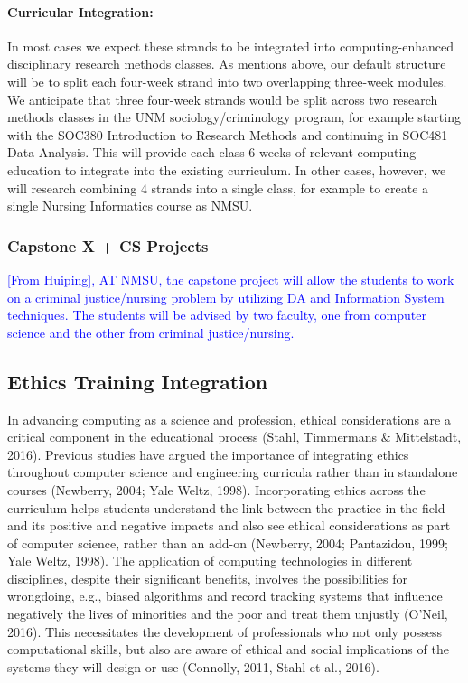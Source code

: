 \paragraph{Curricular Integration:} In most cases we expect these strands to be integrated into computing-enhanced disciplinary research methods classes. As mentions above, our default structure will be to split each four-week strand into two overlapping three-week modules. We anticipate that three four-week strands would be split across two research methods classes in the UNM sociology/criminology program, for example starting with the SOC380 Introduction to Research Methods and continuing in SOC481 Data Analysis. This will provide each class 6 weeks of relevant computing education to integrate into the existing curriculum. In other cases, however, we will research combining 4 strands into a single class, for example to create a single Nursing Informatics course as NMSU. 

\subsubsection{Capstone X + CS Projects}

\textcolor{blue}{[From Huiping], AT NMSU, the capstone project will allow the students to work on a criminal justice/nursing problem by utilizing DA and Information System techniques. The students will be advised by two faculty, one from computer science and the other from criminal justice/nursing.
}

\subsection{Ethics Training Integration}
In advancing computing as a science and profession, ethical considerations are a critical component in the educational process (Stahl, Timmermans \& Mittelstadt, 2016). Previous studies have argued the importance of integrating ethics throughout computer science and engineering curricula rather than in standalone courses (Newberry, 2004; Yale Weltz, 1998). Incorporating ethics across the curriculum helps students understand the link between the practice in the field and its positive and negative impacts and also see ethical considerations as part of computer science, rather than an add-on (Newberry, 2004; Pantazidou, 1999; Yale Weltz, 1998). The application of computing technologies in different disciplines, despite their significant benefits, involves the possibilities for wrongdoing, e.g., biased algorithms and record tracking systems that influence negatively the lives of minorities and the poor and treat them unjustly (O’Neil, 2016). This necessitates the development of professionals who not only possess computational skills, but also are aware of ethical and social implications of the systems they will design or use (Connolly, 2011, Stahl et al., 2016).

